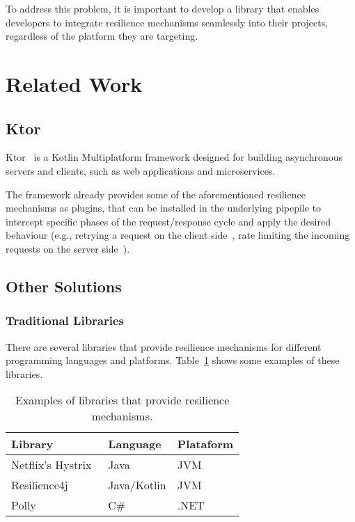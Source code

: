 To address this problem, it is important to develop a library that enables developers to integrate resilience mechanisms seamlessly into their projects, regardless of the platform they are targeting.


\section{Related Work}\label{sec:related-work}

\subsection{Ktor}\label{subsec:ktor}
Ktor~\cite{ktor} is a Kotlin Multiplatform framework designed for building asynchronous servers and clients, such as web applications and microservices.

The framework already provides some of the aforementioned resilience mechanisms as plugins,
that can be installed in the underlying pipepile
to intercept specific phases of the request/response cycle and apply the desired behaviour
(e.g., retrying a request on the client side~\cite{ktor-client-retry},
rate limiting the incoming requests on the server side~\cite{ktor-server-rate-limit}).

\subsection{Other Solutions}\label{subsec:other-solutions}

\subsubsection{Traditional Libraries}

There are several libraries that provide resilience mechanisms for different programming languages and platforms.
Table~\ref{tab:resilience_libraries} shows some examples of these libraries.

\begin{table}[!htb]
    \centering
    \caption{Examples of libraries that provide resilience mechanisms.}
    \label{tab:resilience_libraries}
    \vspace{0.3cm}
    \begin{tabular}{|l|l|l|}
        \hline
        \textbf{Library}                         & \textbf{Language} & \textbf{Plataform} \\ \hline
        Netflix's Hystrix~\cite{netflix-hystrix} & Java              & JVM                \\ \hline
        Resilience4j~\cite{resilience4j}         & Java/Kotlin       & JVM                \\ \hline
        Polly ~\cite{polly-dotnet}               & C\#               & .NET               \\
        \hline
    \end{tabular}
\end{table}

